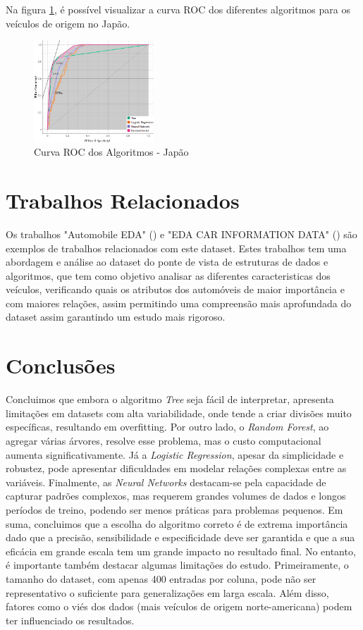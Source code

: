 \documentclass[conference]{IEEEtran}
\begin{document}
Na figura \ref{fig:roc_jp}, é possível visualizar a curva ROC dos diferentes algoritmos para os veículos de origem no Japão.
\begin{figure}[!ht]
	\centering
	\includegraphics[width=0.4\textwidth]{Resources/ROC_JP.png}
	\caption{Curva ROC dos Algoritmos - Japão}
	\label{fig:roc_jp}
\end{figure}
\newpage

\section{Trabalhos Relacionados}
Os trabalhos "Automobile EDA" (\cite{ref2}) e "EDA CAR INFORMATION DATA" (\cite{ref3}) são exemplos de trabalhos relacionados com este dataset.
Estes trabalhos tem uma abordagem e análise ao dataset do ponte de vista de estruturas de dados e algoritmos, que tem como objetivo analisar as
diferentes caracteristicas dos veículos, verificando quais os atributos dos automóveis de maior importância e com maiores relações, assim permitindo
uma compreensão mais aprofundada do dataset assim garantindo um estudo mais rigoroso.

\section{Conclusões}
Concluimos que embora o algoritmo \textit{Tree} seja fácil de interpretar, apresenta limitações em datasets com alta variabilidade,
onde tende a criar divisões muito específicas, resultando em overfitting. Por outro lado, o \textit{Random Forest}, ao agregar várias
árvores, resolve esse problema, mas o custo computacional aumenta significativamente. Já a \textit{Logistic Regression}, apesar da
simplicidade e robustez, pode apresentar dificuldades em modelar relações complexas entre as variáveis. Finalmente, as \textit{Neural Networks}
destacam-se pela capacidade de capturar padrões complexos, mas requerem grandes volumes de dados e longos períodos de treino, podendo
ser menos práticas para problemas pequenos. Em suma, concluimos que a escolha do algoritmo correto é de extrema importância dado que
a precisão, sensibilidade e especificidade deve ser garantida e que a sua eficácia em grande escala tem um grande impacto no resultado final.
No entanto, é importante também destacar algumas limitações do estudo. Primeiramente, o tamanho do dataset, com apenas 400 entradas por coluna,
pode não ser representativo o suficiente para generalizações em larga escala. Além disso, fatores como o viés dos dados
(mais veículos de origem norte-americana) podem ter influenciado os resultados.

\printbibliography
\end{document}
